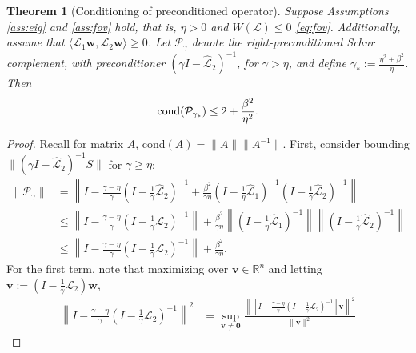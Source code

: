\documentclass[a4paper,10pt]{article}
\newtheorem{theorem}{Theorem}
\begin{document}
{\begin{theorem}[Conditioning of preconditioned operator]\label{th:cond}
Suppose Assumptions \ref{ass:eig} and \ref{ass:fov} hold, that is, $\eta > 0$
and $W(\mathcal{L}) \leq 0$ \eqref{eq:fov}. Additionally, assume that
$\langle\mathcal{L}_1\mathbf{w},\mathcal{L}_2\mathbf{w}\rangle\geq 0$.
Let $\mathcal{P}_\gamma$ denote the right-preconditioned Schur complement,
with preconditioner $(\gamma I - \widehat{\mathcal{L}}_2)^{-1}$, for
$\gamma >\eta$, and define $\gamma_* := \tfrac{\eta^2+\beta^2}{\eta}$.
Then
\begin{align}\label{eq:gammastar}
\textnormal{cond}(\mathcal{P}_{\gamma_*}) \leq 
	2 + \frac{\beta^2}{\eta^2}.
\end{align}
\end{theorem}
\begin{proof}
Recall for matrix $A$, cond$(A) = \|A\|\|A^{-1}\|$.
First, consider bounding $\|(\gamma I- \widehat{\mathcal{L}}_2)^{-1}S\|$ for
$\gamma \geq \eta$:
%
\begin{align}\nonumber
\|\mathcal{P}_\gamma\| & = \left\| I - \frac{\gamma - \eta}{\gamma}
	( I- \tfrac{1}{\gamma}\widehat{\mathcal{L}}_2)^{-1} + 
	\frac{\beta^2}{\gamma\eta}( I- \tfrac{1}{\eta}\widehat{\mathcal{L}}_1)^{-1}
	( I- \tfrac{1}{\gamma}\widehat{\mathcal{L}}_2)^{-1} \right\| \\
& \leq \left\| I - \frac{\gamma-\eta}
	{\gamma}\left(I - \tfrac{1}{\gamma}\mathcal{L}_2\right)^{-1}\right\| +
		\frac{\beta^2}{\gamma\eta}
		\left\|( I- \tfrac{1}{\eta}\widehat{\mathcal{L}}_1)^{-1} \right\|
		\left\|( I- \tfrac{1}{\gamma}\widehat{\mathcal{L}}_2)^{-1}\right\|\nonumber \\
& \leq \left\| I - \frac{\gamma-\eta}
	{\gamma}\left(I - \tfrac{1}{\gamma}\mathcal{L}_2\right)^{-1}\right\| +
		\frac{\beta^2}{\gamma\eta}. \label{eq:Pgn}
\end{align}
%
For the first term, note that maximizing over $\mathbf{v}\in\mathbb{R}^n$ and
letting $\mathbf{v} := (I - \tfrac{1}{\gamma}\mathcal{L}_2)\mathbf{w}$,
%
\begin{align*}
\left\| I - \tfrac{\gamma-\eta}
	{\gamma}(I - \tfrac{1}{\gamma}\mathcal{L}_2)^{-1}\right\|^2
		& = \sup_{\mathbf{v}\neq\mathbf{0}} \frac{\left\| [I - \frac{\gamma-\eta}
	{\gamma}(I - \tfrac{1}{\gamma}\mathcal{L}_2)^{-1}]\mathbf{v}\right\|^2}{\|\mathbf{v}\|^2} 

\end{align*}
\end{proof}}
\end{document}
